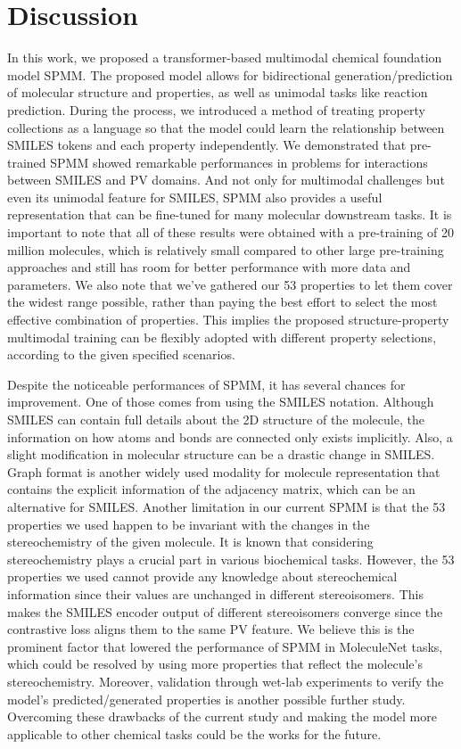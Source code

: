 \documentclass{nature_meth}
\newcommand{\1}{\blmath{1}}
\newcommand{\0}{\blmath{0}}
\begin{document}
\section*{Discussion}
In this work, we proposed a transformer-based multimodal chemical foundation model SPMM. The proposed model allows for bidirectional generation/prediction of molecular structure and properties, as well as unimodal tasks like reaction prediction.
During the process, we introduced a method of treating property collections as a language so that the model could learn the relationship between SMILES tokens and each property independently. We demonstrated that pre-trained SPMM showed remarkable performances in problems for interactions between SMILES and PV domains. And not only for multimodal challenges but even its unimodal feature for SMILES, SPMM also provides a useful representation that can be fine-tuned for many molecular downstream tasks. It is important to note that all of these results were obtained with a pre-training of 20 million molecules, which is relatively small compared to other large pre-training approaches and still has room for better performance with more data and parameters. We also note that we've gathered our 53 properties to let them cover the widest range possible, rather than paying the best effort to select the most effective combination of properties. This implies the proposed structure-property multimodal training can be flexibly adopted with different property selections, according to the given specified scenarios.

Despite the noticeable performances of SPMM, it has several chances for improvement. 
One of those comes from using the SMILES notation. Although SMILES can contain full details about the 2D structure of the molecule, the information on how atoms and bonds are connected only exists implicitly. Also, a slight modification in molecular structure can be a drastic change in SMILES. Graph format is another widely used modality for molecule representation that contains the explicit information of the adjacency matrix, which can be an alternative for SMILES.
Another limitation in our current SPMM is that the 53 properties we used happen to be invariant with the changes in the stereochemistry of the given molecule. It is known that considering stereochemistry plays a crucial part in various biochemical tasks. However, the 53 properties we used cannot provide any knowledge about stereochemical information since their values are unchanged in different stereoisomers. This makes the SMILES encoder output of different stereoisomers converge since the contrastive loss aligns them to the same PV feature. We believe this is the prominent factor that lowered the performance of SPMM in MoleculeNet tasks, which could be resolved by using more properties that reflect the molecule's stereochemistry. 
Moreover, validation through wet-lab experiments to verify the model's predicted/generated properties is another possible further study.
Overcoming these drawbacks of the current study and making the model more applicable to other chemical tasks could be the works for the future.
\end{document}
